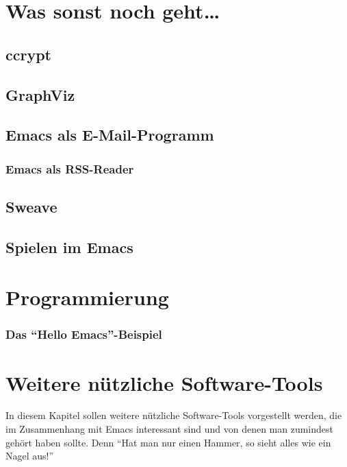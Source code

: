 \documentclass[12pt,ngerman]{scrbook}
\begin{document}
\chapter{Was sonst noch geht\ldots}

\section{ccrypt}

\section{GraphViz}

\section{Emacs als E-Mail-Programm}

\subsection{Emacs als RSS-Reader}

\section{Sweave}

\section{Spielen im Emacs}\label{sec:spielen}

\chapter{Programmierung}

\subsection{Das \enquote{Hello Emacs}-Beispiel}




\chapter{Weitere nützliche Software-Tools}

In diesem Kapitel sollen weitere nützliche Software-Tools vorgestellt werden, die im Zusammenhang mit Emacs interessant sind und von denen man zumindest gehört haben sollte. Denn \enquote{Hat man nur einen Hammer, so sieht alles wie ein Nagel aus!}	
\end{document}
